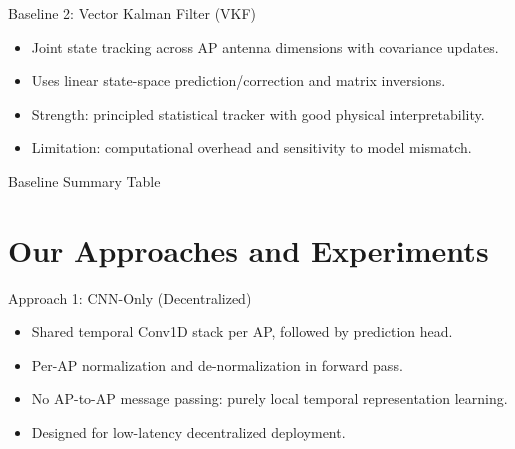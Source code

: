 \documentclass{beamer}
\begin{document}
\begin{frame}{Baseline 2: Vector Kalman Filter (VKF)}
    \small
    \begin{itemize}
        \item Joint state tracking across AP antenna dimensions with covariance updates.
        \item Uses linear state-space prediction/correction and matrix inversions.
        \item Strength: principled statistical tracker with good physical interpretability.
        \item Limitation: computational overhead and sensitivity to model mismatch.
    \end{itemize}
\end{frame}

\begin{frame}{Baseline Summary Table}
    \scriptsize
    \centering
\end{frame}

\section[Approaches + Experiments]{Our Approaches and Experiments}

\begin{frame}{Approach 1: CNN-Only (Decentralized)}
    \small
    \begin{itemize}
        \item Shared temporal Conv1D stack per AP, followed by prediction head.
        \item Per-AP normalization and de-normalization in forward pass.
        \item No AP-to-AP message passing: purely local temporal representation learning.
        \item Designed for low-latency decentralized deployment.
    \end{itemize}
\end{frame}
\end{document}
